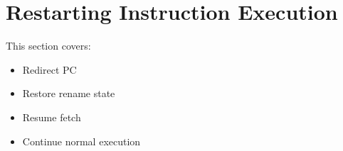 \section{Restarting Instruction Execution}

This section covers:
\begin{itemize}
  \item Redirect PC
  \item Restore rename state
  \item Resume fetch
  \item Continue normal execution
\end{itemize}

\begin{rtlrefs}
\end{rtlrefs}
